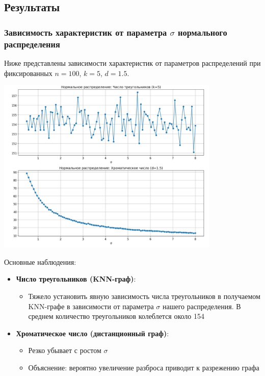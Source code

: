 \documentclass[a4paper,12pt]{article}
\begin{document}
\subsection{Результаты}

\subsubsection{Зависимость характеристик от параметра $\sigma$ нормального распределения}
Ниже представлены зависимости характеристик от параметров распределений при фиксированных $n=100$, $k=5$, $d=1.5$.

\begin{center}
\includegraphics[width=0.8\textwidth]{images/normal_sigmas.png}
\end{center}

Основные наблюдения:
\begin{itemize}
    \item \textbf{Число треугольников (KNN-граф)}:
    \begin{itemize}
        \item Тяжело установить явную зависимость числа треугольников в получаемом KNN-графе в зависимости от параметра $\sigma$ нашего распределения. В среднем количество треугольников колеблется около 154
    \end{itemize}
    
    \item \textbf{Хроматическое число (дистанционный граф)}:
    \begin{itemize}
        \item Резко убывает с ростом $\sigma$
        \item Объяснение: вероятно увеличение разброса приводит к разрежению графа
    \end{itemize}
\end{itemize}
\end{document}
